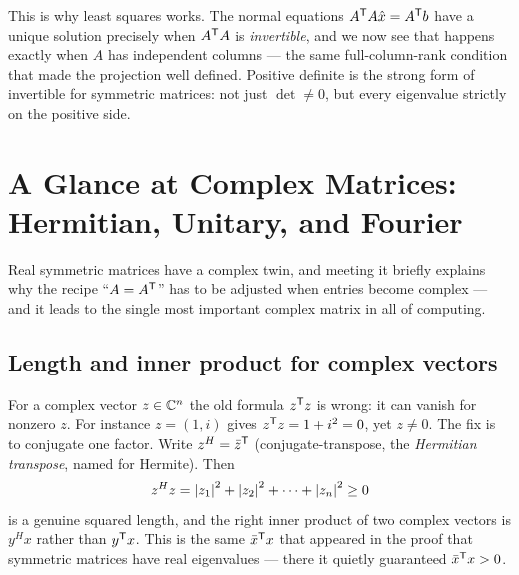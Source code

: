 This is why least squares works. The normal equations $A^{\mathsf T} A\hat x=A^{\mathsf T} b$ have a unique solution precisely when $A^{\mathsf T} A$ is \emph{invertible}, and we now see that happens exactly when $A$ has independent columns --- the same full-column-rank condition that made the projection well defined. Positive definite is the strong form of invertible for symmetric matrices: not just $\det\neq0$, but every eigenvalue strictly on the positive side.


\section{A Glance at Complex Matrices: Hermitian, Unitary, and Fourier}
\label{sec:complex}

Real symmetric matrices have a complex twin, and meeting it briefly explains why the recipe ``$A=A^{\mathsf T}$'' has to be adjusted when entries become complex --- and it leads to the single most important complex matrix in all of computing.

\subsection{Length and inner product for complex vectors}

For a complex vector $z\in\mathbb{C}^n$ the old formula $z^{\mathsf T} z$ is wrong: it can vanish for nonzero $z$. For instance $z=(1,i)$ gives $z^{\mathsf T} z=1+i^2=0$, yet $z\neq0$. The fix is to conjugate one factor. Write $z^H=\bar z^{\mathsf T}$ (conjugate-transpose, the \emph{Hermitian transpose}, named for Hermite). Then
\[
   z^H z=\left|z_1\right|^2+\left|z_2\right|^2+\cdots+\left|z_n\right|^2\ge 0
\]
is a genuine squared length, and the right inner product of two complex vectors is $y^H x$ rather than $y^{\mathsf T} x$. This is the same $\bar x^{\mathsf T} x$ that appeared in the proof that symmetric matrices have real eigenvalues --- there it quietly guaranteed $\bar x^{\mathsf T} x>0$.

